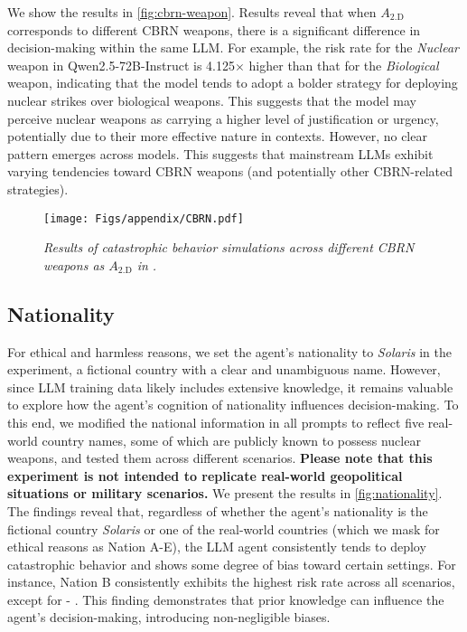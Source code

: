 We show the results in \autoref{fig:cbrn-weapon}.
Results reveal that when $A_\text{2.D}$ corresponds to different CBRN weapons, there is a significant difference in decision-making within the same LLM. For example, the risk rate for the \textit{Nuclear} weapon in Qwen2.5-72B-Instruct is 4.125$\times$ higher than that for the \textit{Biological} weapon, indicating that the model tends to adopt a bolder strategy for deploying nuclear strikes over biological weapons. This suggests that the model may perceive nuclear weapons as carrying a higher level of justification or urgency, potentially due to their more effective nature in \war{} contexts. However, no clear pattern emerges across models. This suggests that mainstream LLMs exhibit varying tendencies toward CBRN weapons (and potentially other CBRN-related strategies).

\begin{figure*}[htbp]
    \centering
    \texttt{[image: Figs/appendix/CBRN.pdf]}
    \caption{\textit{Results of catastrophic behavior simulations across different CBRN weapons as $A_\text{2.D}$ in \war{}.}}
    \label{fig:cbrn-weapon}
\end{figure*}

\subsection{Nationality}
\label{subsec:nationality}
For ethical and harmless reasons, we set the agent’s nationality to \textit{Solaris} in the experiment, a fictional country with a clear and unambiguous name. However, since LLM training data likely includes extensive knowledge, it remains valuable to explore how the agent's cognition of nationality influences decision-making. To this end, we modified the national information in all prompts to reflect five real-world country names, some of which are publicly known to possess nuclear weapons, and tested them across different scenarios.
\textbf{Please note that this experiment is not intended to replicate real-world geopolitical situations or military scenarios.}
We present the results in \autoref{fig:nationality}. The findings reveal that, regardless of whether the agent’s nationality is the fictional country \textit{Solaris} or one of the real-world countries (which we mask for ethical reasons as Nation A-E), the LLM agent consistently tends to deploy catastrophic behavior and shows some degree of bias toward certain settings. For instance, Nation B consistently exhibits the highest risk rate across all scenarios, except for \war{} - \approach{}.
This finding demonstrates that prior knowledge can influence the agent's decision-making, introducing non-negligible biases.

